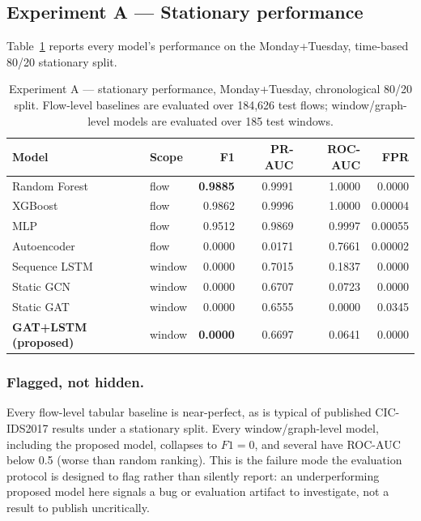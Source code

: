 \documentclass[twocolumn]{llncs}
\begin{document}
\subsection{Experiment A --- Stationary performance}
\label{sec:expa}

Table~\ref{tab:expa} reports every model's performance on the Monday+Tuesday, time-based 80/20
stationary split.

\begin{table}[!t]
\centering
\caption{Experiment A --- stationary performance, Monday+Tuesday, chronological 80/20 split.
Flow-level baselines are evaluated over 184{,}626 test flows; window/graph-level models are
evaluated over 185 test windows.}
\label{tab:expa}
\begin{tabular}{|l|l|r|r|r|r|}
\hline
Model & Scope & F1 & PR-AUC & ROC-AUC & FPR \\
\hline
Random Forest        & flow   & \textbf{0.9885} & 0.9991 & 1.0000 & 0.0000 \\
XGBoost               & flow   & 0.9862 & 0.9996 & 1.0000 & 0.00004 \\
MLP                   & flow   & 0.9512 & 0.9869 & 0.9997 & 0.00055 \\
Autoencoder            & flow   & 0.0000 & 0.0171 & 0.7661 & 0.00002 \\
Sequence LSTM          & window & 0.0000 & 0.7015 & 0.1837 & 0.0000 \\
Static GCN             & window & 0.0000 & 0.6707 & 0.0723 & 0.0000 \\
Static GAT             & window & 0.0000 & 0.6555 & 0.0000 & 0.0345 \\
\textbf{GAT+LSTM (proposed)} & window & \textbf{0.0000} & 0.6697 & 0.0641 & 0.0000 \\
\hline
\end{tabular}
\end{table}

\subsubsection{Flagged, not hidden.} Every flow-level tabular baseline is near-perfect, as is typical
of published CIC-IDS2017 results under a stationary split. Every window/graph-level model,
including the proposed model, collapses to $F1=0$, and several have ROC-AUC below 0.5 (worse than
random ranking). This is the failure mode the evaluation protocol is designed to flag rather than
silently report: an underperforming proposed model here signals a bug or evaluation artifact to
investigate, not a result to publish uncritically.
\end{document}
